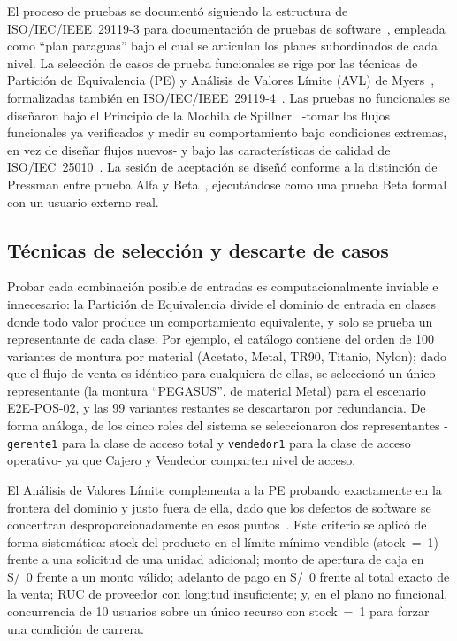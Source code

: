 \documentclass[conference]{IEEEtran}
\begin{document}
El proceso de pruebas se documentó siguiendo la estructura de ISO/IEC/IEEE~29119-3 para documentación de pruebas de software~\cite{ieee29119}, empleada como ``plan paraguas'' bajo el cual se articulan los planes subordinados de cada nivel. La selección de casos de prueba funcionales se rige por las técnicas de Partición de Equivalencia (PE) y Análisis de Valores Límite (AVL) de Myers~\cite{myers2011}, formalizadas también en ISO/IEC/IEEE~29119-4~\cite{ieee29119-4}. Las pruebas no funcionales se diseñaron bajo el Principio de la Mochila de Spillner~\cite{spillner2014} -tomar los flujos funcionales ya verificados y medir su comportamiento bajo condiciones extremas, en vez de diseñar flujos nuevos- y bajo las características de calidad de ISO/IEC~25010~\cite{iso25010}. La sesión de aceptación se diseñó conforme a la distinción de Pressman entre prueba Alfa y Beta~\cite{pressman2010}, ejecutándose como una prueba Beta formal con un usuario externo real.

\subsection{Técnicas de selección y descarte de casos}

Probar cada combinación posible de entradas es computacionalmente inviable e innecesario: la Partición de Equivalencia divide el dominio de entrada en clases donde todo valor produce un comportamiento equivalente, y solo se prueba un representante de cada clase. Por ejemplo, el catálogo contiene del orden de 100 variantes de montura por material (Acetato, Metal, TR90, Titanio, Nylon); dado que el flujo de venta es idéntico para cualquiera de ellas, se seleccionó un único representante (la montura ``PEGASUS'', de material Metal) para el escenario E2E-POS-02, y las 99 variantes restantes se descartaron por redundancia. De forma análoga, de los cinco roles del sistema se seleccionaron dos representantes -\texttt{gerente1} para la clase de acceso total y \texttt{vendedor1} para la clase de acceso operativo- ya que Cajero y Vendedor comparten nivel de acceso.

El Análisis de Valores Límite complementa a la PE probando exactamente en la frontera del dominio y justo fuera de ella, dado que los defectos de software se concentran desproporcionadamente en esos puntos~\cite{myers2011}. Este criterio se aplicó de forma sistemática: stock del producto en el límite mínimo vendible (stock~=~1) frente a una solicitud de una unidad adicional; monto de apertura de caja en S/~0 frente a un monto válido; adelanto de pago en S/~0 frente al total exacto de la venta; RUC de proveedor con longitud insuficiente; y, en el plano no funcional, concurrencia de 10 usuarios sobre un único recurso con stock~=~1 para forzar una condición de carrera.
\end{document}
